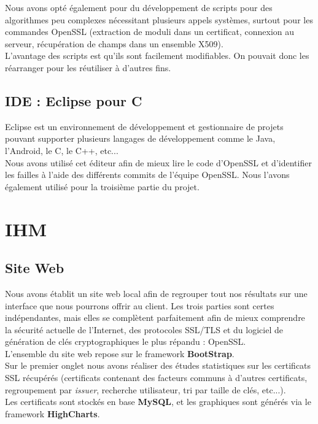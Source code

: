 Nous avons opté également pour du développement de scripts pour des algorithmes peu complexes nécessitant plusieurs appels systèmes, surtout pour les commandes OpenSSL (extraction de moduli dans un certificat, connexion au serveur, récupération de champs dans un ensemble X509).\\
L'avantage des scripts est qu'ils sont facilement modifiables. On pouvait donc les réarranger pour les réutiliser à d'autres fins.

\subsection{IDE : Eclipse pour C}

Eclipse est un environnement de développement et gestionnaire de projets pouvant supporter plusieurs langages de développement comme le Java, l'Android, le C, le C++, etc...\\
Nous avons utilisé cet éditeur afin de mieux lire le code d'OpenSSL et d'identifier les failles à l'aide des différents commits de l'équipe OpenSSL. Nous l'avons également utilisé pour la troisième partie du projet.

\section{IHM}

\subsection{Site Web}

Nous avons établit un site web local afin de regrouper tout nos résultats sur une interface que nous pourrons offrir au client. Les trois parties sont certes indépendantes, mais elles se complètent parfaitement afin de mieux comprendre la sécurité actuelle de l'Internet, des protocoles SSL/TLS et du logiciel de génération de clés cryptographiques le plus répandu : OpenSSL.\\
L'ensemble du site web repose sur le framework \textbf{BootStrap}.\\

Sur le premier onglet nous avons réaliser des études statistiques sur les certificats SSL récupérés (certificats contenant des facteurs communs à d'autres certificats, regroupement par \textit{issuer}, recherche utilisateur, tri par taille de clés, etc...).\\
Les certificats sont stockés en base \textbf{MySQL}, et les graphiques sont générés via le framework \textbf{HighCharts}.\\

